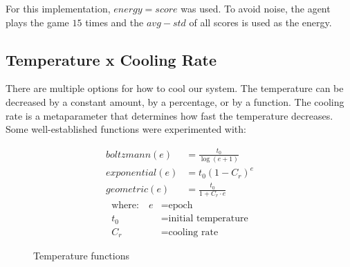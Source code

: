 \documentclass[review]{elsarticle}
\begin{document}
For this implementation, $energy = score$ was used. To avoid noise, the agent plays the game $15$ times and the $avg - std$ of all scores is used as the energy. 

\subsection{Temperature x Cooling Rate}
There are multiple options for how to cool our system. The temperature can be decreased by a constant amount, by a percentage, or by a function. The cooling rate is a metaparameter that determines how fast the temperature decreases. Some well-established functions were experimented with:

\begin{align}
    boltzmann(e) &= \frac{t_0}{\log(e + 1)} \\
    exponential(e) &= t_0 (1 - C_r)^e \\
    geometric(e) &= \frac{t_0}{1 + C_r \cdot e}
\end{align}
\begin{align*}
    \text{where:}\quad 
    e &= \text{epoch}\\
    t_0 &= \text{initial temperature}\\
    C_r &= \text{cooling rate}
\end{align*}

\begin{figure}[H]
    \centering
    \caption{Temperature functions}
    \label{fig:temp}
\end{figure}
\end{document}
